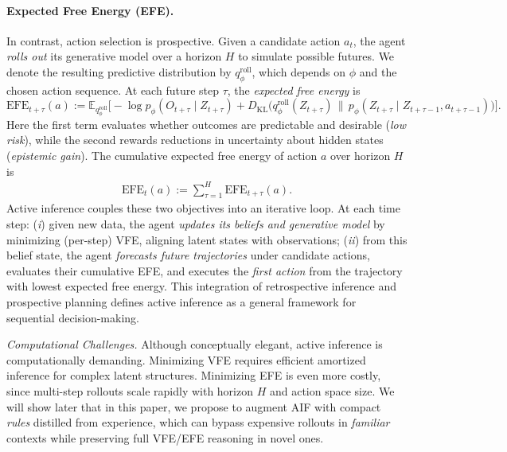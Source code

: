 \documentclass{article} %
\begin{document}
\paragraph{Expected Free Energy (EFE).}
In contrast, action selection is prospective.  
Given a candidate action $a_t$, the agent \emph{rolls out} its generative model over a horizon $H$ to simulate possible futures. 
We denote the resulting predictive distribution by $q_\phi^{\text{roll}}$, which depends on $\phi$ and the chosen action sequence.  
At each future step $\tau$, the \emph{expected free energy} is
{\small$$
\text{EFE}_{t+\tau}(a) :=
\mathbb{E}_{q_\phi^{\text{roll}}} \Big[
-\log p_\phi(O_{t+\tau}\mid Z_{t+\tau})
+ D_{\mathrm{KL}}\!\big(q_\phi^{\text{roll}}(Z_{t+\tau}) \,\|\, p_\phi(Z_{t+\tau}\mid Z_{t+\tau-1},a_{t+\tau-1})\big)
\Big].
$$}
Here the first term evaluates whether outcomes are predictable and desirable (\emph{low risk}),  
while the second rewards reductions in uncertainty about hidden states (\emph{epistemic gain}).  
The cumulative expected free energy of action $a$ over horizon $H$ is
{\small \begin{align}
\text{EFE}_{t}(a) := \sum_{\tau=1}^H \text{EFE}_{t+\tau}(a).
\label{eq:EFE}
\end{align}}
Active inference couples these two objectives into an iterative loop.  
At each time step:  
({\it i}) given new data, the agent \emph{updates its beliefs and generative model} by minimizing (per-step) VFE, aligning latent states with observations;  
({\it ii}) from this belief state, the agent \emph{forecasts future trajectories} under candidate actions, evaluates their cumulative EFE, and executes the {\it first action} from the trajectory with lowest expected free energy.  
This integration of retrospective inference and prospective planning defines active inference as a general framework for sequential decision-making.  

{\it Computational Challenges.} Although conceptually elegant, active inference is computationally demanding.  
Minimizing VFE requires efficient amortized inference for complex latent structures.  
Minimizing EFE is even more costly, since multi-step rollouts scale rapidly with horizon $H$ and action space size.  
We will show later that in this paper, we propose to augment AIF with compact \emph{rules} distilled from experience, which can bypass expensive rollouts in {\it familiar} contexts while preserving full VFE/EFE reasoning in novel ones.  
\end{document}
